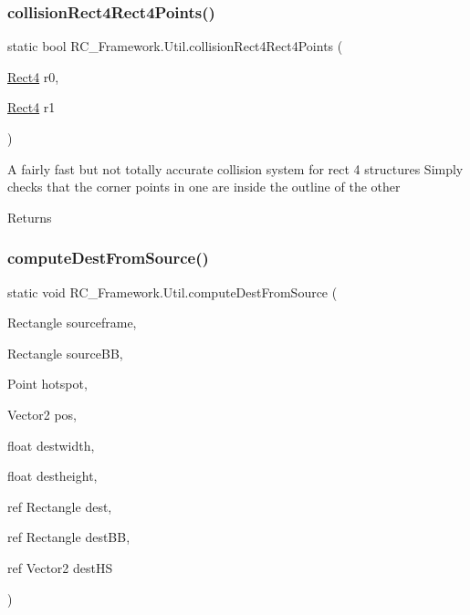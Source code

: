 \subsubsection{\texorpdfstring{collision\+Rect4\+Rect4\+Points()}{collisionRect4Rect4Points()}}
{\footnotesize\ttfamily static bool R\+C\+\_\+\+Framework.\+Util.\+collision\+Rect4\+Rect4\+Points (\begin{DoxyParamCaption}\item[{\mbox{\hyperlink{class_r_c___framework_1_1_rect4}{Rect4}}}]{r0,  }\item[{\mbox{\hyperlink{class_r_c___framework_1_1_rect4}{Rect4}}}]{r1 }\end{DoxyParamCaption})\hspace{0.3cm}{\ttfamily [static]}}



A fairly fast but not totally accurate collision system for rect 4 structures Simply checks that the corner points in one are inside the outline of the other 

\begin{DoxyReturn}{Returns}

\end{DoxyReturn}
\mbox{\label{class_r_c___framework_1_1_util_aa1110dfd94a9f1963a560f4266f5db4e}} 
\subsubsection{\texorpdfstring{compute\+Dest\+From\+Source()}{computeDestFromSource()}}
{\footnotesize\ttfamily static void R\+C\+\_\+\+Framework.\+Util.\+compute\+Dest\+From\+Source (\begin{DoxyParamCaption}\item[{Rectangle}]{sourceframe,  }\item[{Rectangle}]{source\+BB,  }\item[{Point}]{hotspot,  }\item[{Vector2}]{pos,  }\item[{float}]{destwidth,  }\item[{float}]{destheight,  }\item[{ref Rectangle}]{dest,  }\item[{ref Rectangle}]{dest\+BB,  }\item[{ref Vector2}]{dest\+HS }\end{DoxyParamCaption})\hspace{0.3cm}{\ttfamily [static]}}




